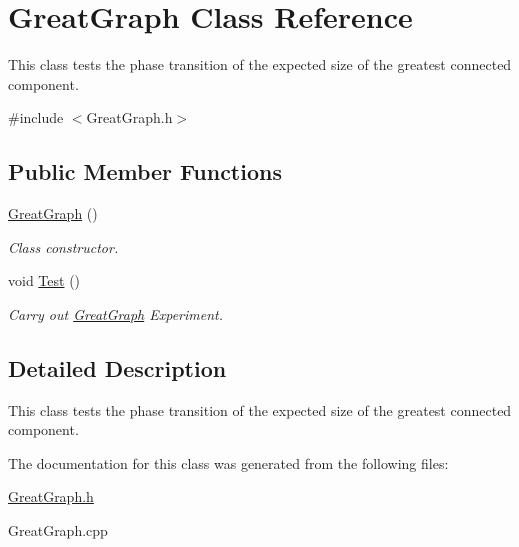 \hypertarget{classGreatGraph}{}\section{Great\+Graph Class Reference}
\label{classGreatGraph}


This class tests the phase transition of the expected size of the greatest connected component.  




{\ttfamily \#include $<$Great\+Graph.\+h$>$}

\subsection*{Public Member Functions}
\begin{DoxyCompactItemize}
\item 
\mbox{\label{classGreatGraph_ac8819fe94dd3357e652ab6a4034fcfde}} 
\hyperlink{classGreatGraph_ac8819fe94dd3357e652ab6a4034fcfde}{Great\+Graph} ()
\begin{DoxyCompactList}\small\item\em Class constructor. \end{DoxyCompactList}\item 
\mbox{\label{classGreatGraph_a83ab89b530e736def7e680978f248aa7}} 
void \hyperlink{classGreatGraph_a83ab89b530e736def7e680978f248aa7}{Test} ()
\begin{DoxyCompactList}\small\item\em Carry out \textquotesingle{}\hyperlink{classGreatGraph}{Great\+Graph}\textquotesingle{} Experiment. \end{DoxyCompactList}\end{DoxyCompactItemize}


\subsection{Detailed Description}
This class tests the phase transition of the expected size of the greatest connected component. 

The documentation for this class was generated from the following files\+:\begin{DoxyCompactItemize}
\item 
\hyperlink{GreatGraph_8h}{Great\+Graph.\+h}\item 
Great\+Graph.\+cpp\end{DoxyCompactItemize}
